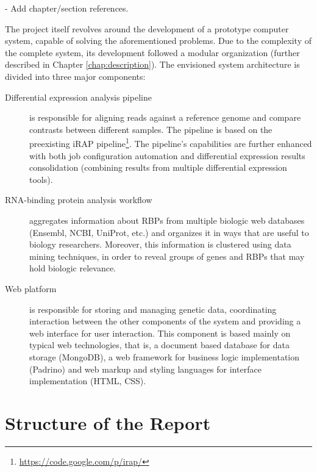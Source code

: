 \begin{Notes}
- Add chapter/section references.\\
\end{Notes}

The project itself revolves around the development of a prototype computer
system, capable of solving the aforementioned problems. Due to the complexity of
the complete system, its development followed a modular organization (further
described in Chapter \ref{chap:description}). The envisioned system
architecture is divided into three major components:

\begin{description}

  \item[Differential expression analysis pipeline]
  is responsible for aligning reads against a reference genome and compare
  contrasts between different samples. The pipeline is based on the preexisting
  iRAP pipeline\footnote{\url{https://code.google.com/p/irap/}}. The pipeline's
  capabilities are further enhanced with both job configuration automation and
  differential expression results consolidation (combining results from multiple
  differential expression tools).

  \item[RNA-binding protein analysis workflow]
  aggregates information about RBPs from multiple biologic web databases
  (Ensembl, NCBI, UniProt, etc.) and organizes it in ways that are useful to
  biology researchers. Moreover, this information is clustered using data mining
  techniques, in order to reveal groups of genes and RBPs that may hold biologic
  relevance.

  \item[Web platform]
  is responsible for storing and managing genetic data, coordinating interaction
  between the other components of the system and providing a web interface for
  user interaction. This component is based mainly on typical web technologies,
  that is, a document based database for data storage (MongoDB), a web framework
  for business logic implementation (Padrino) and web markup and styling
  languages for interface implementation (HTML, CSS).

\end{description}

\section{Structure of the Report} \label{sec:outline}

